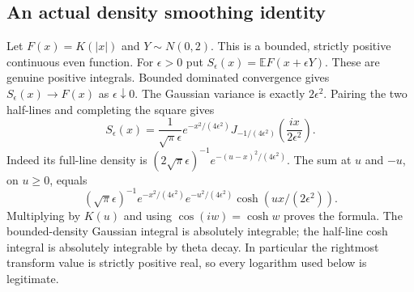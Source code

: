 \documentclass[11pt]{article}
\theoremstyle{remark}\newtheorem{remark}[theorem]{Remark}
\begin{document}
\subsection*{An actual density smoothing identity}
Let $F(x)=K(|x|)$ and $Y\sim N(0,2)$. This is a bounded, strictly
positive continuous even function. For $\epsilon>0$ put
$S_\epsilon(x)=\mathbb E F(x+\epsilon Y)$. These are genuine positive
integrals. Bounded dominated convergence gives
$S_\epsilon(x)\to F(x)$ as $\epsilon\downarrow0$.
The Gaussian variance is exactly $2\epsilon^2$. Pairing the two
half-lines and completing the square gives
\begin{equation}\label{eq:quadraticdensityheat}
 S_\epsilon(x)=\frac{1}{\sqrt\pi\epsilon}
 e^{-x^2/(4\epsilon^2)}
 J_{-1/(4\epsilon^2)}\left(\frac{ix}{2\epsilon^2}\right).
\end{equation}
Indeed its full-line density is
$(2\sqrt\pi\epsilon)^{-1}e^{-(u-x)^2/(4\epsilon^2)}$.
The sum at $u$ and $-u$, on $u\geq0$, equals
\[
 (\sqrt\pi\epsilon)^{-1}e^{-x^2/(4\epsilon^2)}
 e^{-u^2/(4\epsilon^2)}\cosh(ux/(2\epsilon^2)).
\]
Multiplying by $K(u)$ and using $\cos(iw)=\cosh w$ proves the formula.
The bounded-density Gaussian integral is absolutely integrable;
the half-line cosh integral is absolutely integrable by theta decay.
In particular the rightmost transform value is strictly positive real,
so every logarithm used below is legitimate.
\end{document}
